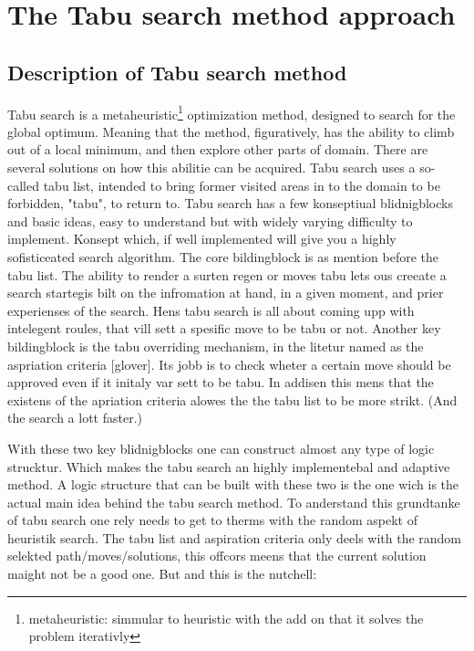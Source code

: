 \section{The Tabu search method approach}

\subsection{Description of Tabu search method}

Tabu search is a metaheuristic\footnote{ metaheuristic: simmular to heuristic  with the add on that it solves the problem iterativly}  optimization method, designed to search for the global optimum. Meaning that the method, figuratively, has the ability to climb out of a local minimum, and then explore other parts of domain.
There are several solutions on how this abilitie can be acquired. Tabu search uses a so-called tabu list, intended to bring former visited areas in to the domain to be forbidden, "tabu", to return to.
Tabu search has a few konseptiual blidnigblocks and basic ideas, easy to understand but with widely varying difficulty to implement. Konsept which, if well implemented will give you a highly sofisticeated search algorithm.
The core bildingblock is as mention before the tabu list. The ability to render a surten regen or moves tabu lets ous creeate a search startegis bilt on the infromation at hand, in a given moment, and prier experienses of the search. Hens tabu search is all about coming upp with intelegent roules, that vill sett a spesific move to be tabu or not. 
Another key bildingblock is the tabu overriding mechanism, in the litetur named as the aspriation criteria [glover]. Its jobb is to check wheter a certain move should be approved even if it initaly var sett to be tabu. In addisen this mens that the existens of the apriation criteria alowes the the tabu list to be more strikt. (And the search a lott faster.)

With these two key blidnigblocks one can construct almost any type of logic strucktur. 
Which makes the tabu search an highly implementebal and adaptive method.
A logic structure  that can be built with these two is the one wich is the actual main idea behind the tabu search method.
To anderstand this grundtanke of tabu search one rely needs to get to therms with the random aspekt of heuristik search. 
The tabu list and aspiration criteria only deels with the random selekted path/moves/solutions, this offcors meens that the current solution maight not be a good one. But and this is the nutchell: 

